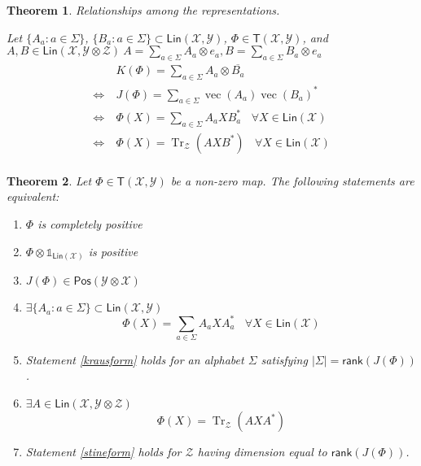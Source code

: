 \documentclass[aps,pra,onecolumn,notitlepage,superscriptaddress]{revtex4-1}
\newcommand{\spc}[1]{\mathcal{#1}}
\newcommand{\Lin}{\mathsf{Lin}}
\newcommand{\Pos}{\mathsf{Pos}}
\newcommand{\T}{\mathsf{T}}
\newcommand{\rank}{\mathsf{rank}}
\newcommand{\Tr}{\operatorname{Tr}}
\newcommand{\op}[1]{\operatorname{#1}}
\newcommand\I{\mathds{1}}
\newtheorem{theo}{Theorem}
\begin{document}
    \begin{theo}
        Relationships among the representations. 
        
        Let $\{A_a : a \in \Sigma\}$, $\{B_a : a \in \Sigma\} \subset \Lin(\spc X,\spc Y)$, $\Phi \in \T(\spc X,\spc Y)$, and $A,B \in \Lin(\spc X, \spc Y \otimes \spc Z) \ A = \sum_{a \in \Sigma} A_a \otimes e_a, B = \sum_{a \in \Sigma} B_a \otimes e_a$
        \begin{align*}
            & K(\Phi) = \sum_{a \in \Sigma} A_a \otimes \overline{B_a}\\
            \Longleftrightarrow \ & J(\Phi) = \sum_{a \in \Sigma} \op{vec}(A_a) \op{vec}(B_a)^*\\
            \Longleftrightarrow \ & \Phi(X) = \sum_{a \in \Sigma}A_a X B_a^* \ \ \ \ \forall X \in \Lin(\spc X)\\
            \Longleftrightarrow \ & \Phi(X) = \Tr_{\spc Z}(AXB^*) \ \ \ \ \forall X \in \Lin(\spc X)\\
        \end{align*}
    \end{theo}

    \begin{theo}
        Let $\Phi \in \T(\spc X, \spc Y)$ be a non-zero map. The following statements are equivalent:
        \begin{enumerate}
            \item $\Phi$ is completely positive
            \item $\Phi \otimes \I_{\Lin(\spc X)}$ is positive
            \item $J(\Phi) \in \Pos(\spc Y \otimes \spc X)$
            \item \label{krausform} $\exists \{ A_a : a \in \Sigma \} \subset \Lin(\spc X, \spc Y)$
            \begin{equation}
                \Phi(X) = \sum_{a \in \Sigma} A_a X A_a^* \ \ \ \ \forall X \in \Lin(\spc X)
            \end{equation}
            \item Statement \ref{krausform} holds for an alphabet $\Sigma$ satisfying $|\Sigma| = \rank(J(\Phi))$.
            \item \label{stineform} $\exists A \in \Lin(\spc X, \spc Y\otimes \spc Z)$
            \begin{equation}
                \Phi(X) = \Tr_{\spc Z}(AXA^*)
            \end{equation}
            \item Statement \ref{stineform} holds for $\spc Z$ having dimension equal to $\rank(J(\Phi))$.
        \end{enumerate}
    \end{theo}
\end{document}
